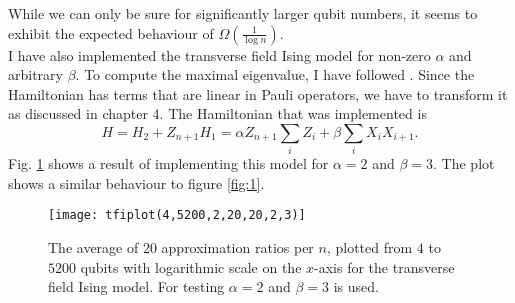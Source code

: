 \noindent While we can only be sure for significantly larger qubit numbers, it seems to exhibit the expected behaviour of $\Omega(\frac{1}{\log{}n})$.\\
I have also implemented the transverse field Ising model for non-zero $\alpha$ and arbitrary $\beta$.
To compute the maximal eigenvalue, I have followed \cite{pfeuty70}.
Since the Hamiltonian has terms that are linear in Pauli operators, we have to transform it as discussed in chapter 4.
The Hamiltonian that was implemented is \[
H = H_2 + Z_{n+1}H_1 =\alpha Z_{n+1}\sum_{i} Z_i + \beta \sum_{i} X_iX_{i+1}
.\]
Fig. \ref{fig:2} shows a result of implementing this model for $\alpha=2$ and $\beta=3$.
The plot shows a similar behaviour to figure \ref{fig:1}.
\begin{figure}[H]
	\centering
	\texttt{[image: tfiplot(4,5200,2,20,20,2,3)]}
	\caption{The average of $20$ approximation ratios per $n$, plotted from $4$ to $5200$ qubits with logarithmic scale on the $x$-axis for the transverse field Ising model. For testing $\alpha=2$ and $\beta=3$ is used.}
	\label{fig:2}
\end{figure}

